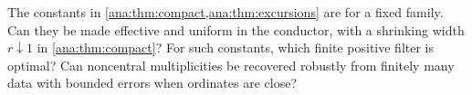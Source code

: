 \begin{question}\label{ana:q:family}
The constants in \cref{ana:thm:compact,ana:thm:excursions} are for a fixed
family. Can they be made effective and uniform in the conductor, with a
shrinking width $r\downarrow1$ in \cref{ana:thm:compact}? For such constants, which finite
positive filter is optimal? Can noncentral multiplicities be recovered robustly from finitely
many data with bounded errors when ordinates are close?
\end{question}

